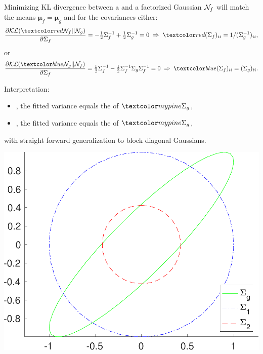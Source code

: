 \begin{frame}
Minimizing KL divergence between a  and a
factorized Gaussian ${\cal N}_f$ will match the means
$\boldsymbol\mu_f=\boldsymbol\mu_g$ and for the covariances either:
\[
\frac{\partial {\KL}(\Red{{\cal N}_f}||{\cal N}_g)}{\partial\Sigma_f}=
-\tfrac{1}{2}\Sigma_f^{-1}+\tfrac{1}{2}\Sigma_g^{-1}=0\;\Rightarrow\;
\Red{(\Sigma_f)_{ii} = 1/(\Sigma_g^{-1})_{ii}},
\]
or
\[
\frac{\partial {\KL}(\Blue{{\cal N}_g}||{\cal N}_f)}{\partial\Sigma_f}=
\tfrac{1}{2}\Sigma_f^{-1}-\tfrac{1}{2}\Sigma_f^{-1}\Sigma_g\Sigma_f^{-1}=0\;
\Rightarrow\;\Blue{(\Sigma_f)_{ii} = (\Sigma_g)_{ii}}.
\]
%
\parbox{0.7\linewidth}{
Interpretation:
\begin{itemize}
\item {}, the fitted variance
equals the  of $\Green{\Sigma_g}$,
\item {}, the fitted variance
equals the  of $\Green{\Sigma_g}$,
\end{itemize}
with straight forward generalization to block diagonal Gaussians.
}
\parbox{0.29\linewidth}{
\hfill
\includegraphics[width=\linewidth]{kl}
}

\end{frame}

